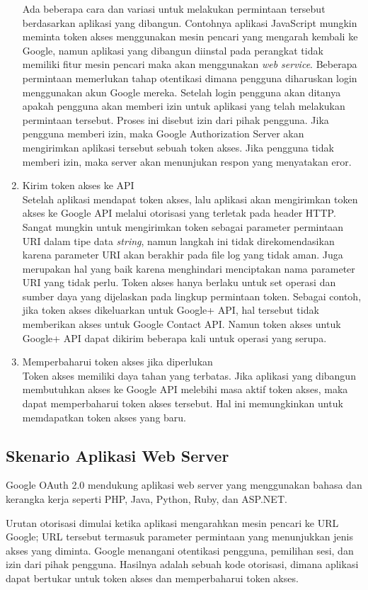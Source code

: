 \begin{enumerate}
Ada beberapa cara dan variasi untuk melakukan permintaan tersebut berdasarkan aplikasi yang dibangun. Contohnya aplikasi JavaScript mungkin meminta token akses menggunakan mesin pencari yang mengarah kembali ke Google, namun aplikasi yang dibangun diinstal pada perangkat tidak memiliki fitur mesin pencari maka akan menggunakan {\it web service}. Beberapa permintaan memerlukan tahap otentikasi dimana pengguna diharuskan login menggunakan akun Google mereka. Setelah login pengguna akan ditanya apakah pengguna akan memberi izin untuk aplikasi yang telah melakukan permintaan tersebut. Proses ini disebut izin dari pihak pengguna. Jika pengguna memberi izin, maka Google Authorization Server akan mengirimkan aplikasi tersebut sebuah token akses. Jika pengguna tidak memberi izin, maka server akan menunjukan respon yang menyatakan eror.
\item
Kirim token akses ke API\\
Setelah aplikasi mendapat token akses, lalu aplikasi akan mengirimkan token akses ke Google API melalui otorisasi yang terletak pada header HTTP. Sangat mungkin untuk mengirimkan token sebagai parameter permintaan URI dalam tipe data {\it string}, namun langkah ini tidak direkomendasikan karena parameter URI akan berakhir pada file log yang tidak aman. Juga merupakan hal yang baik karena menghindari menciptakan nama parameter URI yang tidak perlu.
Token akses hanya berlaku untuk set operasi dan sumber daya yang dijelaskan pada lingkup permintaan token. Sebagai contoh, jika token akses dikeluarkan untuk Google+ API, hal tersebut tidak memberikan akses untuk Google Contact API. Namun token akses untuk Google+ API dapat dikirim beberapa kali untuk operasi yang serupa.
\item
Memperbaharui token akses jika diperlukan\\
Token akses memiliki daya tahan yang terbatas. Jika aplikasi yang dibangun membutuhkan akses ke Google API melebihi masa aktif token akses, maka dapat memperbaharui token akses tersebut. Hal ini memungkinkan untuk memdapatkan token akses yang baru.
\end{enumerate}

\subsection{Skenario Aplikasi Web Server}
Google OAuth 2.0 mendukung aplikasi web server yang menggunakan bahasa dan kerangka kerja seperti PHP, Java, Python, Ruby, dan ASP.NET.

Urutan otorisasi dimulai ketika aplikasi mengarahkan mesin pencari ke URL Google; URL tersebut termasuk parameter permintaan yang menunjukkan jenis akses yang diminta. Google menangani otentikasi pengguna, pemilihan sesi, dan izin dari pihak pengguna. Hasilnya adalah sebuah kode otorisasi, dimana aplikasi dapat bertukar untuk token akses dan memperbaharui token akses.

